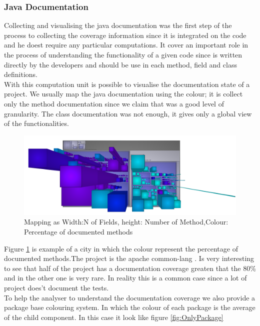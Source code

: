 \documentclass[]{usiinfbachelorproject}
\begin{document}
\subsubsection{Java Documentation}
Collecting and visualising the java documentation was the first step of the process to collecting the coverage information since it is integrated on the code and he doest require any  particular computations. It cover an important role in the process of understanding the functionality of a given code since is written directly by the developers and should be use in each method, field and class definitions.\\
With this computation unit is possible to visualise the documentation state of a project. We usually map the java documentation using the colour; it is collect only the method documentation since we claim that was a good level of granularity. The class documentation was not enough, it gives only a global view of the functionalities.

\begin{figure}[H]
	\centering
	\includegraphics[width=1\textwidth]{images/javaDoc}
	
	\caption[Java Documentation Mapping]{Mapping as Width:N of Fields, height: Number of Method,Colour: Percentage of documented methods\label{fig:javaDoc}}

\end{figure}

Figure \ref{fig:javaDoc} is example of a city in which the colour represent the percentage of documented methods.The project is the apache common-lang . Is very interesting to see that half of the project has a documentation coverage greaten that the 80\% and in the other one is very rare. In reality this is a common case since a lot of project does't document the tests.\\
To help the analyser to understand the documentation coverage we also provide a package base colouring system. In which the colour of each package is the average of the child component. In  this case it look like figure \ref{fig:OnlyPackage}
\end{document}
